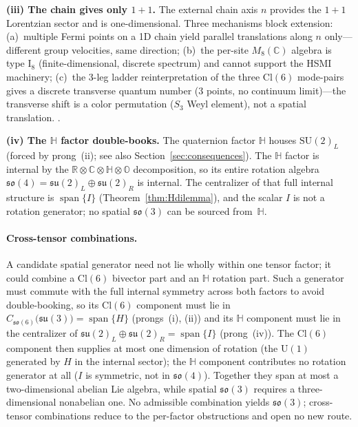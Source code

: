 \documentclass[aip,jmp,amsmath,amssymb,reprint,author-year]{revtex4-2}
\begin{document}
\medskip\noindent
\textbf{(iii) The chain gives only $1{+}1$.}
The external chain axis $n$ provides the $1{+}1$ Lorentzian sector and is
one-dimensional.  Three mechanisms block extension: (a)~multiple Fermi
points on a 1D chain yield parallel translations along $n$
only---different group velocities, same direction; (b)~the per-site
$M_8(\mathbb{C})$ algebra is type $\mathrm{I}_8$ (finite-dimensional,
discrete spectrum) and cannot support the HSMI machinery; (c)~the 3-leg
ladder reinterpretation of the three $\mathrm{Cl}(6)$ mode-pairs gives a
discrete transverse quantum number (3 points, no continuum limit)---the
transverse shift is a color permutation ($S_3$ Weyl element), not a
spatial translation.
\citep{MultiHSMI}.

\medskip\noindent
\textbf{(iv) The $\mathbb{H}$ factor double-books.}
The quaternion factor $\mathbb{H}$ houses $\mathrm{SU}(2)_L$ (forced by
prong~(ii); see also Section~\ref{sec:consequences}).  The $\mathbb{H}$
factor is internal by the
$\mathbb{R} \otimes \mathbb{C} \otimes \mathbb{H} \otimes \mathbb{O}$
decomposition, so its entire rotation algebra
$\mathfrak{so}(4) = \mathfrak{su}(2)_L \oplus \mathfrak{su}(2)_R$ is
internal.  The centralizer of that full internal structure is
$\operatorname{span}\{I\}$ (Theorem~\ref{thm:Hdilemma}), and the scalar
$I$ is not a rotation generator; no spatial $\mathfrak{so}(3)$ can be
sourced from~$\mathbb{H}$.

\paragraph{Cross-tensor combinations.}
A candidate spatial generator need not lie wholly within one tensor
factor; it could combine a $\mathrm{Cl}(6)$ bivector part and an
$\mathbb{H}$ rotation part.  Such a generator must commute with the full
internal symmetry across both factors to avoid double-booking, so its
$\mathrm{Cl}(6)$ component must lie in
$C_{\mathfrak{so}(6)}\!\bigl(\mathfrak{su}(3)\bigr) =
\operatorname{span}\{H\}$ (prongs~(i), (ii)) and its $\mathbb{H}$
component must lie in the centralizer of
$\mathfrak{su}(2)_L \oplus \mathfrak{su}(2)_R = \operatorname{span}\{I\}$
(prong~(iv)).  The $\mathrm{Cl}(6)$ component then supplies at most one
dimension of rotation (the $\mathrm{U}(1)$ generated by $H$ in the
internal sector); the $\mathbb{H}$ component contributes no rotation
generator at all ($I$ is symmetric, not in $\mathfrak{so}(4)$).  Together
they span at most a two-dimensional abelian Lie algebra, while spatial
$\mathfrak{so}(3)$ requires a three-dimensional nonabelian one.  No
admissible combination yields $\mathfrak{so}(3)$; cross-tensor
combinations reduce to the per-factor obstructions and open no new route.
\end{document}
